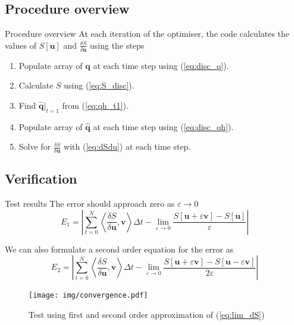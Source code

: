 \documentclass{beamer}
\newcommand{\eq}[1]{(\ref{eq:#1})}
\newcommand{\vect}[1]{\ensuremath{\mathbf{#1}}}
\newcommand{\hvect}[1]{\ensuremath{\hat{\vect{#1}}}}
\newcommand{\vv}[2]{\frac{\delta #1}{\delta #2}}
\newcommand{\angles}[1]{\left\langle #1 \right\rangle}
\newcommand{\eps}{\varepsilon}
\begin{document}
\subsection{Procedure overview}
\begin{frame}{Procedure overview}
At each iteration of the optimiser, the code calculates the values of $S[\vect u]$ and $\vv{S}{\vect u}$ using the steps
\begin{enumerate}
\item Populate array of $\vect q$ at each time step using \eq{disc_q}.
\item Calculate $S$ using \eq{S_disc}.
\item Find $\hvect q|_{t=1}$ from \eq{qh_t1}.
\item Populate array of $\hvect q$ at each time step using \eq{disc_qh}.
\item Solve for $\vv{S}{\vect u}$ with \eq{dSdu} at each time step.
\end{enumerate}
\end{frame}

\subsection{Verification}
\begin{frame}{Test results}
The error should approach zero as $\eps \rightarrow 0$
\begin{equation}
  \label{eq:error_o1}
  E_1 = \left| \displaystyle \sum^{N}_{t=0} \angles{\vv{S}{\vect u},\vect v}\Delta
    t - \lim_{\eps \rightarrow 0} 
  \frac{S[\vect u + \eps \vect v] - S[\vect u]}{\eps} \right|
\end{equation}

We can also formulate a second order equation for the error as
\begin{equation}
  \label{eq:test_2nd}
   E_2 = \left\vert \displaystyle \sum^{N}_{t=0} \angles{\vv{S}{\vect u},\vect v}\Delta t - \lim_{\eps \rightarrow 0} 
  \frac{S[\vect u + \eps \vect v] - S[\vect u - \eps \vect v] }{2\eps} \right\vert
\end{equation}
\end{frame}

\begin{frame}
\begin{figure}[h!]
  \centering
  \texttt{[image: img/convergence.pdf]}
  \caption{Test using first and second order approximation of
    \eq{lim_dS} }
  \label{fig:convergence}
\end{figure}


\end{frame}
\end{document}
